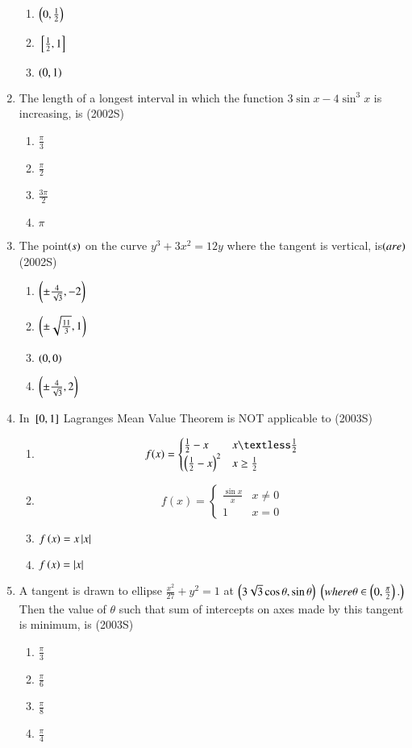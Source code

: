 \documentclass[journal,10pt,twocolumn]{IEEEtran}
\theoremstyle{remark}
\begin{document}
\begin{enumerate}[start=9]
\begin{enumerate}
    \item $\left(0,\frac{1}{2}\right)$
    \item ${}\left[\frac{1}{2},1\right]$
    \item $\left(0,1\right)$
\end{enumerate}
\item The length of a longest interval in which the function $3\sin x-4\sin^3x$ is increasing, is \hfill {(2002S)} \\
\begin{enumerate}
    \item $\frac{\pi}{3}$
    \item $\frac{\pi}{2}$
    \item $\frac{3\pi}{2}$
    \item $\pi$
\end{enumerate}
\item The point$\left(s\right)$ on the curve $y^3+3x^2=12y$ where the tangent is vertical, is$\left(are\right)$ \hfill{(2002S)} \\
\begin{enumerate}
    \item $\left(\pm \frac{4}{\sqrt{3}},-2\right)$
    \item $\left(\pm \sqrt{\frac{11}{3}},1\right)$
    \item $\left(0,0\right)$
    \item $\left(\pm \frac{4}{\sqrt{3}},2\right)$
\end{enumerate}
\item In ${}\left[0,1\right]$ Lagranges Mean Value Theorem is NOT applicable to \hfill {(2003S)} \\
\begin{enumerate}
    \item $$  f(x) = 
\begin{cases} 
\frac{1}{2}-x &  x \textless \frac{1}{2}\\
\brak{\frac{1}{2}-x}^2 & x \geq \frac{1}{2}
\end{cases}
$$
    \item $$  f(x) = 
\begin{cases} 
\frac{\sin x}{x} &  x \neq 0\\
1 & x = 0
\end{cases}
$$
    \item $f\left(x\right)=x\left\vert x\right\vert$
    \item $f\left(x\right)=\left\vert x\right\vert$
\end{enumerate}
\item A tangent is drawn to ellipse $\frac{x^2}{27}+y^2=1$ at $\left(3\sqrt{3}\cos \theta, \sin \theta\right)$ $\left(where \theta \in \left(0,\frac{\pi}{2}\right).\right)$ Then the value of $\theta$ such that sum of intercepts on axes made by this tangent is minimum, is \hfill {(2003S)} \\
\begin{enumerate}
    \item $\frac{\pi}{3}$
    \item $\frac{\pi}{6}$
    \item $\frac{\pi}{8}$
    \item $\frac{\pi}{4}$
\end{enumerate}
\end{enumerate}
\end{document}

